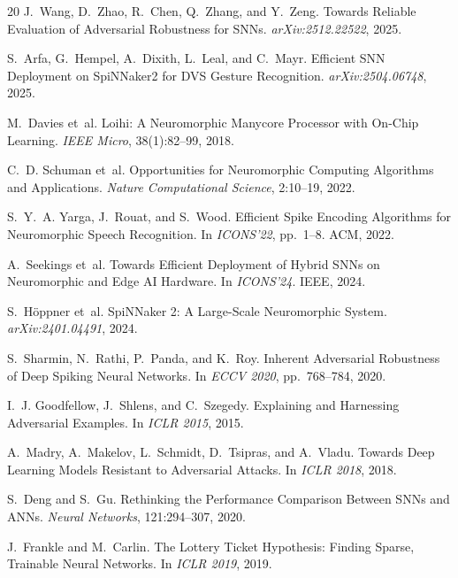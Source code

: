 \documentclass[sigconf,nonacm=false]{acmart}
\begin{document}
\begin{thebibliography}{20}
J.~Wang, D.~Zhao, R.~Chen, Q.~Zhang, and Y.~Zeng.
\newblock Towards Reliable Evaluation of Adversarial Robustness for SNNs.
\newblock \textit{arXiv:2512.22522}, 2025.

S.~Arfa, G.~Hempel, A.~Dixith, L.~Leal, and C.~Mayr.
\newblock Efficient SNN Deployment on SpiNNaker2 for DVS Gesture Recognition.
\newblock \textit{arXiv:2504.06748}, 2025.

M.~Davies et~al.
\newblock Loihi: A Neuromorphic Manycore Processor with On-Chip Learning.
\newblock \textit{IEEE Micro}, 38(1):82--99, 2018.

C.~D. Schuman et~al.
\newblock Opportunities for Neuromorphic Computing Algorithms and Applications.
\newblock \textit{Nature Computational Science}, 2:10--19, 2022.

S.~Y.~A. Yarga, J.~Rouat, and S.~Wood.
\newblock Efficient Spike Encoding Algorithms for Neuromorphic Speech Recognition.
\newblock In \textit{ICONS'22}, pp.~1--8. ACM, 2022.

A.~Seekings et~al.
\newblock Towards Efficient Deployment of Hybrid SNNs on Neuromorphic and Edge AI Hardware.
\newblock In \textit{ICONS'24}. IEEE, 2024.

S.~H\"{o}ppner et~al.
\newblock SpiNNaker 2: A Large-Scale Neuromorphic System.
\newblock \textit{arXiv:2401.04491}, 2024.

S.~Sharmin, N.~Rathi, P.~Panda, and K.~Roy.
\newblock Inherent Adversarial Robustness of Deep Spiking Neural Networks.
\newblock In \textit{ECCV 2020}, pp.~768--784, 2020.

I.~J. Goodfellow, J.~Shlens, and C.~Szegedy.
\newblock Explaining and Harnessing Adversarial Examples.
\newblock In \textit{ICLR 2015}, 2015.

A.~Madry, A.~Makelov, L.~Schmidt, D.~Tsipras, and A.~Vladu.
\newblock Towards Deep Learning Models Resistant to Adversarial Attacks.
\newblock In \textit{ICLR 2018}, 2018.

S.~Deng and S.~Gu.
\newblock Rethinking the Performance Comparison Between SNNs and ANNs.
\newblock \textit{Neural Networks}, 121:294--307, 2020.

J.~Frankle and M.~Carlin.
\newblock The Lottery Ticket Hypothesis: Finding Sparse, Trainable Neural Networks.
\newblock In \textit{ICLR 2019}, 2019.


\end{thebibliography}
\end{document}
